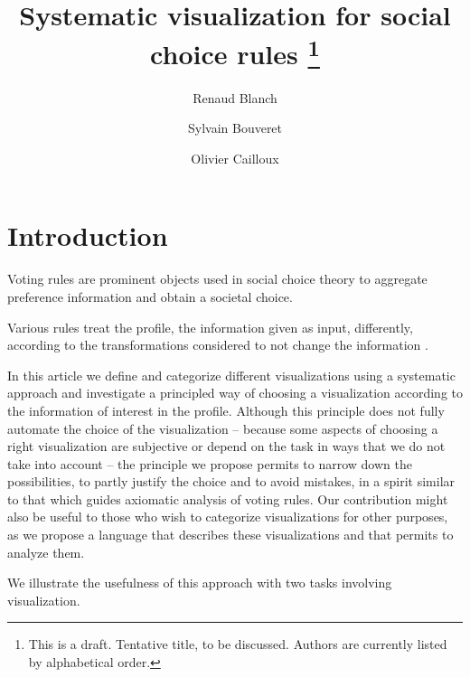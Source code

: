 \documentclass[version=last, pagesize, twoside=off, bibliography=totoc, DIV=calc, fontsize=12pt, a4paper, french, english]{scrartcl}
\begin{document}
\title{%
	\texorpdfstring{
		Systematic visualization for social choice rules%
		\thanks{
			This is a draft. Tentative title, to be discussed. Authors are currently listed by alphabetical order.
		}
	}{%
		Systematic visualization for social choice rules
	}
}
\author{Renaud Blanch}
\author{Sylvain Bouveret}
\author{Olivier Cailloux}
\maketitle

\section{Introduction}
\label{sec:intro}
Voting rules are prominent objects used in social choice theory to aggregate preference information and obtain a societal choice.

Various rules treat the profile, the information given as input, differently, according to the transformations considered to not change the information \citep{sen_social_1986, sen_informational_1974, sen_weights_1977, blackorby_social_1984}.

In this article we define and categorize different visualizations using a systematic approach and investigate a principled way of choosing a visualization according to the information of interest in the profile. Although this principle does not fully automate the choice of the visualization -- because some aspects of choosing a right visualization are subjective or depend on the task in ways that we do not take into account -- the principle we propose permits to narrow down the possibilities, to partly justify the choice and to avoid mistakes, in a spirit similar to that which guides axiomatic analysis of voting rules. Our contribution might also be useful to those who wish to categorize visualizations for other purposes, as we propose a language that describes these visualizations and that permits to analyze them.

We illustrate the usefulness of this approach with two tasks involving visualization.
\end{document}
